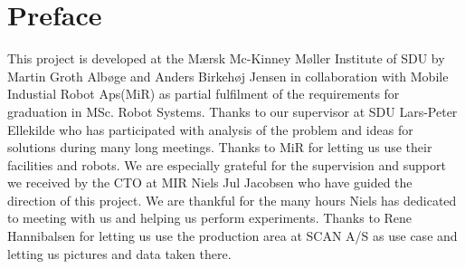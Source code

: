 \chapter*{Preface}
This project is developed at the Mærsk Mc-Kinney Møller Institute of SDU by Martin Groth Albøge and Anders Birkehøj Jensen in collaboration with Mobile Industial Robot Aps(MiR)  as partial fulfilment of the requirements for graduation in MSc. Robot Systems. 
Thanks to our supervisor at SDU Lars-Peter Ellekilde who has participated with analysis of the problem and ideas for solutions during many long meetings.
Thanks to MiR for letting us use their facilities and robots.
We are especially grateful for the supervision and support we received by the CTO at MIR Niels Jul Jacobsen who have guided the direction of this project.
We are thankful for the many hours Niels has dedicated to meeting with us and helping us perform experiments.
Thanks to Rene Hannibalsen for letting us use the production area at SCAN A/S as use case and letting us pictures and data taken there.

\vspace{1 cm}

